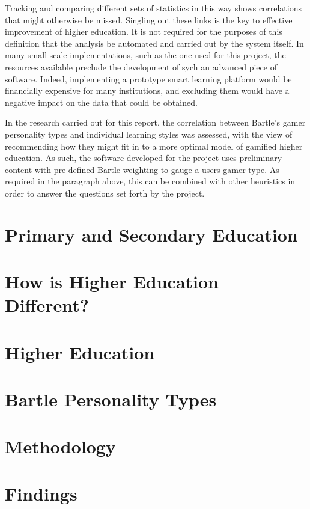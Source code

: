 \documentclass{article}
\begin{document}
Tracking and comparing different sets of statistics in this way shows correlations that might otherwise be missed. Singling out these links is the key to effective improvement of higher education. It is not required for the purposes of this definition that the analysis be automated and carried out by the system itself. In many small scale implementations, such as the one used for this project, the resources available preclude the development of sych an advanced piece of software. Indeed, implementing a prototype smart learning platform would be financially expensive for many institutions, and excluding them would have a negative impact on the data that could be obtained.

In the research carried out for this report, the correlation between Bartle's gamer personality types and individual learning styles was assessed, with the view of recommending how they might fit in to a more optimal model of gamified higher education. As such, the software developed for the project uses preliminary content with pre-defined Bartle weighting to gauge a users gamer type. As required in the paragraph above, this can be combined with other heuristics in order to answer the questions set forth by the project. 

\section{Primary and Secondary Education}

\section{How is Higher Education Different?}

\section{Higher Education}

\section{Bartle Personality Types}

\section{Methodology}

\section{Findings}
\end{document}
